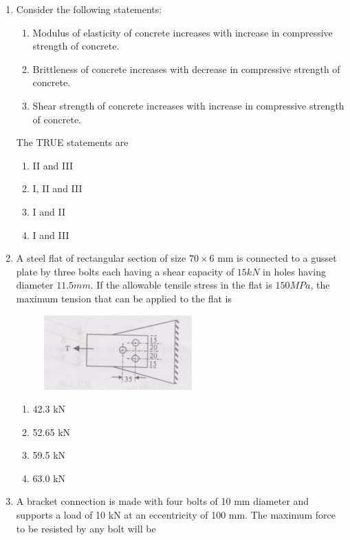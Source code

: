 \documentclass[journal,12pt,onecolumn]{IEEEtran}
\theoremstyle{remark}
\begin{document}
\begin{enumerate}
\item Consider the following statements:

\begin{enumerate}
\item Modulus of elasticity of concrete increases with increase in compressive strength of concrete.
\item Brittleness of concrete increases with decrease in compressive strength of concrete.
\item Shear strength of concrete increases with increase in compressive strength of concrete.
\end{enumerate}

The TRUE statements are

\hfill{}
\begin{enumerate}
\item II and III
\item I, II and III
\item I and II
\item I and III
\end{enumerate}

\item A steel flat of rectangular section of size $70 \times 6$ mm is connected to a gusset plate by three bolts each having a shear capacity of $15 kN$ in holes having diameter $11.5 mm$. If the allowable tensile stress in the flat is $150 MPa$, the maximum tension that can be applied to the flat is

\hfill{}
\begin{figure}[H]
\centering
\includegraphics[width=0.3\columnwidth]{figs/q41.png}
\caption*{}
\label{fig:Q.41}
\end{figure}
\begin{enumerate}
\item 42.3 kN
\item 52.65 kN
\item 59.5 kN
\item 63.0 kN
\end{enumerate}

\item A bracket connection is made with four bolts of 10 mm diameter and supports a load of 10 kN at an eccentricity of 100 mm. The maximum force to be resisted by any bolt will be


\end{enumerate}
\end{document}
